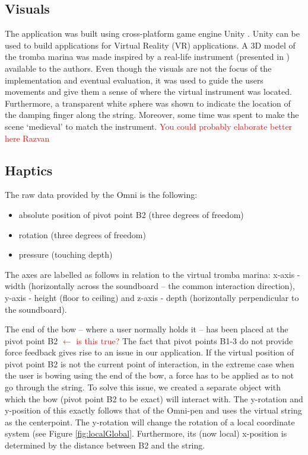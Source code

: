 \documentclass[dvipsnames, pdftex]{article}
\def\SWcomment[#1]{\textcolor{Red}{#1}}
\begin{document}
\subsection{Visuals}
The application was built using cross-platform game engine Unity \cite{unity}. Unity can be used to build applications for Virtual Reality (VR) applications. A 3D model of the tromba marina was made inspired by a real-life instrument (presented in \cite{Baldwin2016}) available to the authors. Even though the visuals are not the focus of the implementation and eventual evaluation, it was used to guide the users movements and give them a sense of where the virtual instrument was located. Furthermore, a transparent white sphere was shown to indicate the location of the damping finger along the string. Moreover, some time was spent to make the scene `medieval' to match the instrument. \SWcomment[You could probably elaborate better here Razvan]

\subsection{Haptics}
The raw data provided by the Omni is the following:
\begin{itemize}
    \item absolute position of pivot point B2 (three degrees of freedom)
    \item rotation (three degrees of freedom)
    \item pressure (touching depth)
\end{itemize}
%
The axes are labelled as follows in relation to the virtual tromba marina: x-axis - width (horizontally across the soundboard -- the common interaction direction), y-axis - height (floor to ceiling) and z-axis - depth (horizontally perpendicular to the soundboard).


The end of the bow -- where a user normally holds it -- has been placed at the pivot point B2 \SWcomment[$\leftarrow$ is this true?]
The fact that pivot points B1-3 do not provide force feedback gives rise to an issue in our application. If the virtual
position of pivot point B2 is not the current point of interaction, in the extreme case when the user is bowing using the end of the bow, a force has to be applied as to not go through the string. To solve this issue, we created a separate object with which the bow (pivot point B2 to be exact) will interact with. The y-rotation and y-position of this exactly follows that of the Omni-pen and uses the virtual string as the centerpoint. The y-rotation will change the rotation of a local coordinate system (see Figure \ref{fig:localGlobal}. Furthermore, its (now local) x-position is determined by the distance between B2 and the string. 
\end{document}
